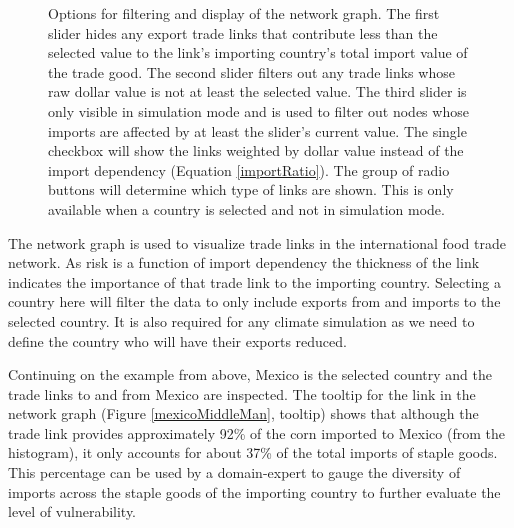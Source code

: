 			\begin{figure}[htb]
				\caption[OPTIONS FOR FILTERING AND DISPLAY OF THE NETWORK GRAPH]{Options for filtering and display of the network graph. The first slider hides any export trade links that contribute less than the selected value to the link's importing country's total import value of the trade good. The second slider filters out any trade links whose raw dollar value is not at least the selected value. The third slider is only visible in simulation mode and is used to filter out nodes whose imports are affected by at least the slider's current value. The single checkbox will show the links weighted by dollar value instead of the import dependency (Equation \ref{importRatio}). The group of radio buttons will determine which type of links are shown. This is only available when a country is selected and not in simulation mode.}
				\label{networkGraphOptions}
			\end{figure}
			The network graph is used to visualize trade links in the international food trade network. As risk is a function of import dependency the thickness of the link indicates the importance of that trade link to the importing country. Selecting a country here will filter the data to only include exports from and imports to the selected country. It is also required for any climate simulation as we need to define the country who will have their exports reduced.\par
			Continuing on the example from above, Mexico is the selected country and the trade links to and from Mexico are inspected. The tooltip for the link in the network graph (Figure \ref{mexicoMiddleMan}, tooltip) shows that although the trade link provides approximately 92\% of the corn imported to Mexico (from the histogram), it only accounts for about 37\% of the total imports of staple goods. This percentage can be used by a domain-expert to gauge the diversity of imports across the staple goods of the importing country to further evaluate the level of vulnerability. \par
